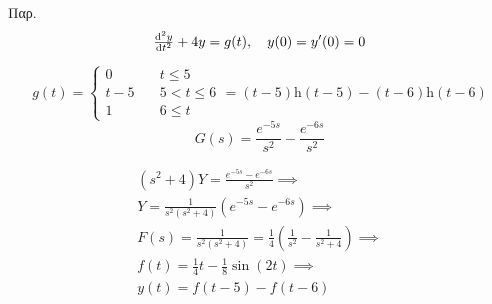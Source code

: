 \documentclass[11pt,a4paper,titlepage,draft]{article}
\begin{document}
\begin{exercise*}{Παρ.}
\[
\od[2]{y}{t}+4y = g(t),\quad y(0)=y'(0)=0
\]

\tcblower
\[
g(t) = \begin{cases}
0\quad & t \leq 5 \\
t-5\quad & 5 < t \leq 6 \\
1\quad & 6 \leq t
\end{cases} =
(t-5) \mathrm h(t-5) - (t-6)\mathrm h(t-6)
\]
\[
G(s) = \frac{e^{-5s}}{s^2}-\frac{e^{-6s}}{s^2}
\]

\begin{align*}
(s^2+4)Y = \frac{e^{-5s}-e^{-6s}}{s^2} \implies \\
Y = \frac{1}{s^2(s^2+4)}(e^{-5s}-e^{-6s}) \implies \\
F(s) = \frac{1}{s^2(s^2+4)} = \frac{1}{4} \left(\frac{1}{s^2}-\frac{1}{s^2+4} \right) \implies \\
\boxed{f(t)=\frac{1}{4}t-\frac{1}{8}\sin(2t)} \implies \\
y(t)=f(t-5)-f(t-6)
\end{align*}
\end{exercise*}
\end{document}

